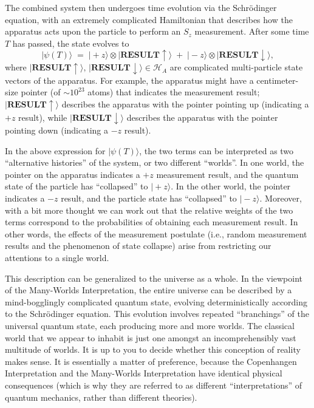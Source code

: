 \documentclass[pra,11pt]{revtex4}
\begin{document}
The combined system then undergoes time evolution via the
Schr\"odinger equation, with an extremely complicated Hamiltonian that
describes how the apparatus acts upon the particle to perform an $S_z$
measurement.  After some time $T$ has passed, the state evolves to
$$|\psi(T)\rangle \;=\; |\!+z \rangle \otimes |\textbf{RESULT}\uparrow\rangle \;+\; |\!-z\rangle\otimes |\textbf{RESULT}\downarrow\rangle, $$
where $|\textbf{RESULT}\uparrow\rangle, \,
|\textbf{RESULT}\downarrow\rangle \in \mathscr{H}_A$ are complicated
multi-particle state vectors of the apparatus.  For example, the
apparatus might have a centimeter-size pointer (of $\sim 10^{23}$
atoms) that indicates the measurement result;
$|\textbf{RESULT}\uparrow\rangle$ describes the apparatus with the
pointer pointing up (indicating a $+z$ result), while
$|\textbf{RESULT}\downarrow\rangle$ describes the apparatus with the
pointer pointing down (indicating a $-z$ result).

In the above expression for $|\psi(T)\rangle$, the two terms can be
interpreted as two ``alternative histories'' of the system, or two
different ``worlds''.  In one world, the pointer on the apparatus
indicates a $+z$ measurement result, and the quantum state of the
particle has ``collapsed'' to $|\!+z\rangle$.  In the other world, the
pointer indicates a $-z$ result, and the particle state has
``collapsed'' to $|\!-z\rangle$.  Moreover, with a bit more thought we
can work out that the relative weights of the two terms correspond to
the probabilities of obtaining each measurement result.  In other
words, the effects of the measurement postulate (i.e., random
measurement results and the phenomenon of state collapse) arise from
restricting our attentions to a single world.

This description can be generalized to the universe as a whole.  In
the viewpoint of the Many-Worlds Interpretation, the entire universe
can be described by a mind-bogglingly complicated quantum state,
evolving deterministically according to the Schr\"odinger equation.
This evolution involves repeated ``branchings'' of the universal
quantum state, each producing more and more worlds.  The classical
world that we appear to inhabit is just one amongst an
incomprehensibly vast multitude of worlds.  It is up to you to decide
whether this conception of reality makes sense.  It is essentially a
matter of preference, because the Copenhangen Interpretation and the
Many-Worlds Interpretation have identical physical consequences (which
is why they are referred to as different ``interpretations'' of
quantum mechanics, rather than different theories).
\end{document}
